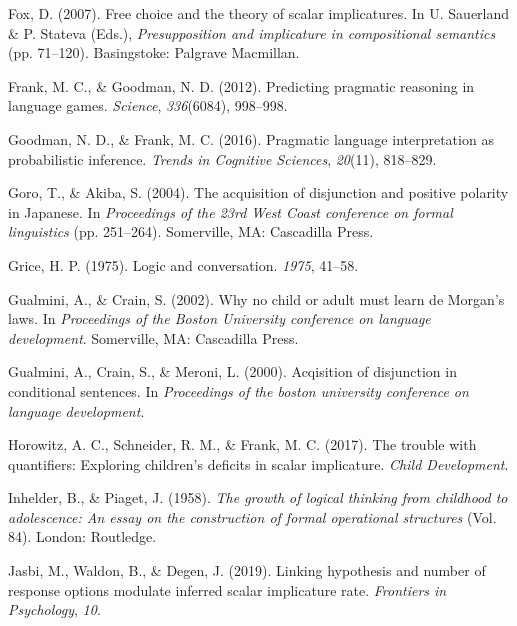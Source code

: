 \documentclass[
  english,
  ,man,floatsintext]{apa6}
\begin{document}
\leavevmode\hypertarget{ref-fox2007free}{}%
Fox, D. (2007). Free choice and the theory of scalar implicatures. In U. Sauerland \& P. Stateva (Eds.), \emph{Presupposition and implicature in compositional semantics} (pp. 71--120). Basingstoke: Palgrave Macmillan.

\leavevmode\hypertarget{ref-frank2012predicting}{}%
Frank, M. C., \& Goodman, N. D. (2012). Predicting pragmatic reasoning in language games. \emph{Science}, \emph{336}(6084), 998--998.

\leavevmode\hypertarget{ref-goodman2016pragmatic}{}%
Goodman, N. D., \& Frank, M. C. (2016). Pragmatic language interpretation as probabilistic inference. \emph{Trends in Cognitive Sciences}, \emph{20}(11), 818--829.

\leavevmode\hypertarget{ref-goro2004acquisition}{}%
Goro, T., \& Akiba, S. (2004). The acquisition of disjunction and positive polarity in Japanese. In \emph{Proceedings of the 23rd West Coast conference on formal linguistics} (pp. 251--264). Somerville, MA: Cascadilla Press.

\leavevmode\hypertarget{ref-grice1975logic}{}%
Grice, H. P. (1975). Logic and conversation. \emph{1975}, 41--58.

\leavevmode\hypertarget{ref-gualminicrain2002}{}%
Gualmini, A., \& Crain, S. (2002). Why no child or adult must learn de Morgan's laws. In \emph{Proceedings of the Boston University conference on language development}. Somerville, MA: Cascadilla Press.

\leavevmode\hypertarget{ref-gualmini2000}{}%
Gualmini, A., Crain, S., \& Meroni, L. (2000). Acqisition of disjunction in conditional sentences. In \emph{Proceedings of the boston university conference on language development}.

\leavevmode\hypertarget{ref-horowitz2017trouble}{}%
Horowitz, A. C., Schneider, R. M., \& Frank, M. C. (2017). The trouble with quantifiers: Exploring children's deficits in scalar implicature. \emph{Child Development}.

\leavevmode\hypertarget{ref-piaget1958growth}{}%
Inhelder, B., \& Piaget, J. (1958). \emph{The growth of logical thinking from childhood to adolescence: An essay on the construction of formal operational structures} (Vol. 84). London: Routledge.

\leavevmode\hypertarget{ref-jasbi2019linking}{}%
Jasbi, M., Waldon, B., \& Degen, J. (2019). Linking hypothesis and number of response options modulate inferred scalar implicature rate. \emph{Frontiers in Psychology}, \emph{10}.
\end{document}
